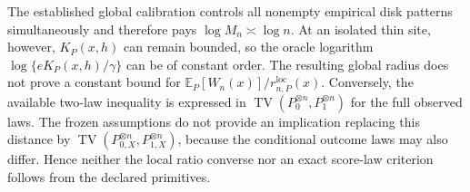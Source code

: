 The established global calibration controls all nonempty empirical disk patterns simultaneously and therefore pays \(\log M_n\asymp\log n\).  At an isolated thin site, however, \(K_P(x,h)\) can remain bounded, so the oracle logarithm \(\log\{eK_P(x,h)/\gamma\}\) can be of constant order.  The resulting global radius does not prove a constant bound for \(\mathbb E_P[W_n(x)]/r_{n,P}^{\mathrm{loc}}(x)\).  Conversely, the available two-law inequality is expressed in \(\operatorname{TV}(P_0^{\otimes n},P_1^{\otimes n})\) for the full observed laws.  The frozen assumptions do not provide an implication replacing this distance by \(\operatorname{TV}(P_{0,X}^{\otimes n},P_{1,X}^{\otimes n})\), because the conditional outcome laws may also differ.  Hence neither the local ratio converse nor an exact score-law criterion follows from the declared primitives.